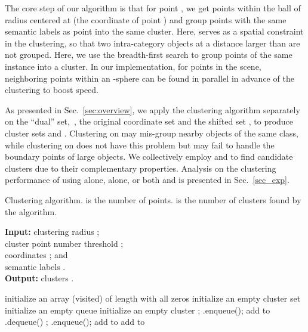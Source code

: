 \documentclass[10pt,twocolumn,letterpaper]{article}
\begin{document}
The core step of our algorithm is that for point , we get points within the ball of radius  centered at  (the coordinate of point ) and group points with the same semantic labels as point  into the same cluster.
Here,  serves as a spatial constraint in the clustering, so that two intra-category objects at a distance larger than  are not grouped.
Here, we use the breadth-first search to group points of the same instance into a cluster.
In our implementation, for points in the scene, neighboring points within an -sphere can be found in parallel in advance of the clustering to boost speed.

As presented in Sec.~\ref{sec:overview}, we apply the clustering algorithm separately on the ``dual'' set,~\ie, the original coordinate set  and the shifted set , to produce cluster sets  and .  
Clustering on  may mis-group nearby objects of the same class, while clustering on  does not have this problem but may fail to handle the boundary points of large objects.
We collectively employ  and  to find candidate clusters due to their complementary properties.
Analysis on the clustering performance of using  alone,  alone, or both  and  is presented in Sec.~\ref{sec_exp}. 



\begin{algorithm}[t]
	\caption{Clustering algorithm.
		 is the number of points.
		 is the number of clusters found by the algorithm.}
	\label{alg_cluster}
	\hspace*{0.02in} {\bf Input:} clustering radius ; \\
	\hspace*{0.44in}
	cluster point number threshold ; \\
	\hspace*{0.44in}
	coordinates ; and \\
	\hspace*{0.44in}
	semantic labels . \\
	\hspace*{0.02in} {\bf Output:} 
	clusters .
	\begin{algorithmic}[1]
		\State initialize an array  (visited) of length  with all zeros
		\State initialize an empty cluster set 
		\State 
		\EndIf
		\EndFor
		\If{}
		\State initialize an empty queue 
		\State initialize an empty cluster 
		\State ; .enqueue(); add  to 
		\State .dequeue()
		\State ; .enqueue(); add  to 
		\EndIf
		\EndFor
		\EndWhile
		\State add  to 
		\EndIf
		\EndIf
		\EndFor
		\State \Return 
	\end{algorithmic}
\end{algorithm}
\end{document}
